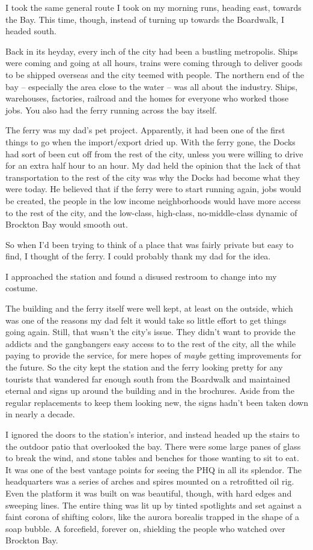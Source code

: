 I took the same general route I took on my morning runs, heading east, towards the Bay. This time, though, instead of turning up towards the Boardwalk, I headed south.

Back in its heyday, every inch of the city had been a bustling metropolis. Ships were coming and going at all hours, trains were coming through to deliver goods to be shipped overseas and the city teemed with people. The northern end of the bay -- especially the area close to the water -- was all about the industry. Ships, warehouses, factories, railroad and the homes for everyone who worked those jobs. You also had the ferry running across the bay itself.

The ferry was my dad's pet project. Apparently, it had been one of the first things to go when the import/export dried up. With the ferry gone, the Docks had sort of been cut off from the rest of the city, unless you were willing to drive for an extra half hour to an hour. My dad held the opinion that the lack of that transportation to the rest of the city was why the Docks had become what they were today. He believed that if the ferry were to start running again, jobs would be created, the people in the low income neighborhoods would have more access to the rest of the city, and the low-class, high-class, no-middle-class dynamic of Brockton Bay would smooth out.

So when I'd been trying to think of a place that was fairly private but easy to find, I thought of the ferry. I could probably thank my dad for the idea.

I approached the station and found a disused restroom to change into my costume.

The building and the ferry itself were well kept, at least on the outside, which was one of the reasons my dad felt it would take so little effort to get things going again. Still, that wasn't the city's issue. They didn't want to provide the addicts and the gangbangers easy access to to the rest of the city, all the while paying to provide the service, for mere hopes of {\em maybe} getting improvements for the future. So the city kept the station and the ferry looking pretty for any tourists that wandered far enough south from the Boardwalk and maintained eternal  and  signs up around the building and in the brochures. Aside from the regular replacements to keep them looking new, the signs hadn't been taken down in nearly a decade.

I ignored the doors to the station's interior, and instead headed up the stairs to the outdoor patio that overlooked the bay. There were some large panes of glass to break the wind, and stone tables and benches for those wanting to sit to eat. It was one of the best vantage points for seeing the PHQ in all its splendor. The headquarters was a series of arches and spires mounted on a retrofitted oil rig. Even the platform it was built on was beautiful, though, with hard edges and sweeping lines. The entire thing was lit up by tinted spotlights and set against a faint corona of shifting colors, like the aurora borealis trapped in the shape of a soap bubble. A forcefield, forever on, shielding the people who watched over Brockton Bay.


